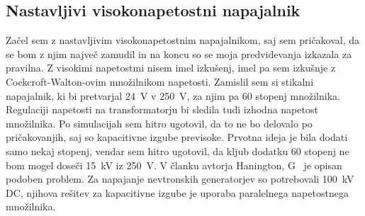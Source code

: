 \documentclass[a4paper,twoside,openright,12pt,Slovene]{book}
\begin{document}
	\subsection{Nastavljivi visokonapetostni napajalnik}
	Začel sem z nastavljivim visokonapetostnim napajalnikom, saj sem pričakoval, da se bom z njim največ zamudil in na koncu so se moja predvidevanja izkazala za pravilna. Z visokimi napetostmi nisem imel izkušenj, imel pa sem izkušnje z Cockcroft-Walton-ovim množilnikom napetosti. Zamislil sem si stikalni napajalnik, ki bi pretvarjal \SI{24}{\volt} v \SI{250}{\volt}, za njim pa 60 stopenj množilnika. Regulaciji napetosti na transformatorju bi sledila tudi izhodna napetost množilnika. Po simulacijah sem hitro ugotovil, da to ne bo delovalo po pričakovanjih, saj so kapacitivne izgube previsoke. Prvotna ideja je bila dodati samo nekaj stopenj, vendar sem hitro ugotovil, da kljub dodatku 60 stopenj ne bom mogel doseči \SI{15}{\kilo\volt} iz \SI{250}{\volt}. V članku avtorja Hanington, G~\cite{ParallelHighVoltageMultipliers} je opisan podoben problem. Za napajanje nevtronskih generatorjev so potrebovali \SI{100}{\kilo\volt} DC, njihova rešitev za kapacitivne izgube je uporaba paralelnega napetostnega množilnika. 
	
\end{document}
